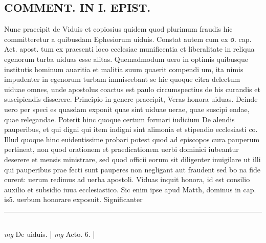 \documentclass{article}
\begin{document}
\begin{pages}
\section*{COMMENT. IN I. EPIST. }\pstart Nunc praecipit de Viduis et copiosius quidem quod plurimum fraudis hic committeretur a quibusdam Ephesiorum uiduis. Constat autem cum ex σ. cap. Act. apost. tum ex praesenti loco ecclesiae munificentia et liberalitate in reliqua egenorum turba uiduas esse alitas. Quemadmodum uero in optimis quibusque institutis hominum auaritia et malitia suum quaerit compendi um, ita nimis impudenter in egenorum turbam immiscebant se hic quoque citra delectum uiduae omnes, unde apostolus coactus est paulo circumspectius de his curandis et suscipiendis disserere. Principio in genere praecipit, Veras honora uiduas. Deinde uero per speci es quasdam exponit quae sint uiduae uerae, quae suscipi endae, quae relegandae. Poterit hinc quoque certum formari iudicium De alendis pauperibus, et qui digni qui item indigni sint alimonia et stipendio ecclesiasti co. Illud quoque hinc euidentissime probari potest quod ad episcopos cura pauperum pertineat, non quod orationem et praedicationem uerbi dominici iubeantur deserere et mensis ministrare, sed quod officii eorum sit diligenter inuigilare ut illi qui pauperibus prae fecti sunt pauperes non negligant aut fraudent sed bo na fide curent: uerum redimus ad uerba apostoli. Viduas inquit honora, id est consilio auxilio et subsidio iuua ecclesiastico. Sic enim ipse apud Matth, dominus in cap. is5. uerbum honorare exposuit. Significanter  \pend
\vspace{0.5cm}\noindent
\vspace{0.2cm}\rule{1cm}{0.2pt}\\ 
\hspace{0.2cm}\textit{mg}
\footnotesize De uiduis. 
\normalsize| 
\hspace{0.2cm}\textit{mg}
\footnotesize Acto. 6. 
\normalsize| 

\end{pages}
\end{document}
